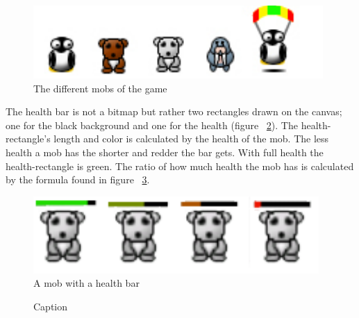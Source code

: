 \begin{figure}[here]
\begin{center}
\includegraphics[scale=0.6]{pics/chapters/chapter4/mobs}
\end{center}
\caption{The different mobs of the game}
\label{fig:mobs}
\end{figure}

The health bar is not a bitmap but rather two rectangles drawn on the canvas; one for the black background and one for the health (figure ~\ref{fig:mobHealthBar}). The health-rectangle's length and color is calculated by the health of the mob. The less health a mob has the shorter and redder the bar gets. With full health the health-rectangle is green. The ratio of how much health the mob has is calculated by the formula found in figure ~\ref{fig:codeExMobHealth}.

\begin{figure}[here]

\begin{center}

\includegraphics[scale=0.6]{pics/chapters/chapter4/mobhealth}

\end{center}

\caption{A mob with a health bar}
\label{fig:mobHealthBar}
\end{figure}

\begin{figure}[htb]

\begin{small}

\end{small}

\caption{Caption}
\label{fig:codeExMobHealth}

\end{figure}
